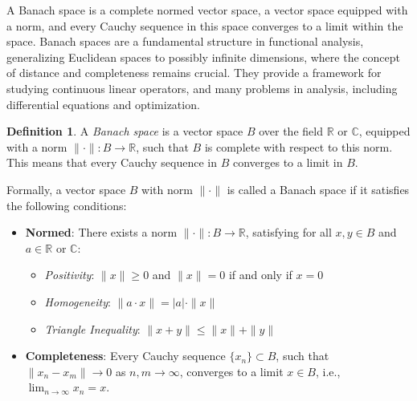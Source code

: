 \documentclass[12pt, reqno]{amsart}
\theoremstyle{definition}
\newtheorem{definition}[theorem]{Definition}
\numberwithin{equation}{section}
\newcommand{\dR}{{\mathbb R}}
\begin{document}
A Banach space is a complete normed vector space, a vector space equipped with a norm, and every Cauchy sequence in this space converges to a limit within the space. Banach spaces are a fundamental structure in functional analysis, generalizing Euclidean spaces to possibly infinite dimensions, where the concept of distance and completeness remains crucial. They provide a framework for studying continuous linear operators, and many problems in analysis, including differential equations and optimization.
\begin{definition}
A \textit{Banach space} is a vector space $B$ over the field $\mathbb{R}$ or $\mathbb{C}$, equipped with a norm $\|\cdot\|: B \to \mathbb{R}$, such that $B$ is complete with respect to this norm. This means that every Cauchy sequence in $B$ converges to a limit in $B$.

Formally, a vector space $B$ with norm $\|\cdot\|$ is called a Banach space if it satisfies the following conditions:

\begin{itemize}
    \item \textbf{Normed}: There exists a norm $\|\cdot\|: B \to \dR$, satisfying for all $x, y \in B$ and $a \in \dR$ or $\mathbb{C}$:
    \begin{itemize}
        \item \textit{Positivity}: $\|x\| \geq 0$ and $\|x\| = 0$ if and only if $x = 0$
        \item \textit{Homogeneity}: $\|a \cdot x\| = |a| \cdot \|x\|$
        \item \textit{Triangle Inequality}: $\|x + y\| \leq \|x\| + \|y\|$
    \end{itemize}
    \item \textbf{Completeness}: Every Cauchy sequence $\{x_n\} \subset B$, such that $\|x_n - x_m\| \to 0$ as $n, m \to \infty$, converges to a limit $x \in B$, i.e., $\lim_{n \to \infty} x_n = x$.
\end{itemize}
\end{definition}
\end{document}
